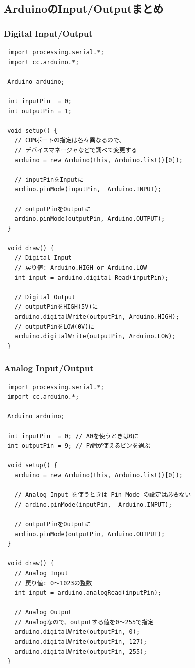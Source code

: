 \documentclass[11pt,a4paper]{jarticle}
\begin{document}
\subsection*{ArduinoのInput/Outputまとめ}

\subsubsection*{Digital Input/Output}
\begin{lstlisting}
 import processing.serial.*;
 import cc.arduino.*;

 Arduino arduino;

 int inputPin  = 0;
 int outputPin = 1;

 void setup() {
   // COMポートの指定は各々異なるので、
   // デバイスマネージャなどで調べて変更する
   arduino = new Arduino(this, Arduino.list()[0]);

   // inputPinをInputに
   ardino.pinMode(inputPin,  Arduino.INPUT);

   // outputPinをOutputに 
   ardino.pinMode(outputPin, Arduino.OUTPUT);
 }

 void draw() {
   // Digital Input
   // 戻り値: Arduino.HIGH or Arduino.LOW
   int input = arduino.digital Read(inputPin);

   // Digital Output
   // outputPinをHIGH(5V)に
   arduino.digitalWrite(outputPin, Arduino.HIGH);
   // outputPinをLOW(0V)に
   arduino.digitalWrite(outputPin, Arduino.LOW);
 } 
\end{lstlisting}


\subsubsection*{Analog Input/Output}
\begin{lstlisting}
 import processing.serial.*;
 import cc.arduino.*;

 Arduino arduino;

 int inputPin  = 0; // A0を使うときは0に
 int outputPin = 9; // PWMが使えるピンを選ぶ 

 void setup() {
   arduino = new Arduino(this, Arduino.list()[0]);

   // Analog Input を使うときは Pin Mode の設定は必要ない
   // ardino.pinMode(inputPin,  Arduino.INPUT);

   // outputPinをOutputに 
   ardino.pinMode(outputPin, Arduino.OUTPUT);
 }

 void draw() {
   // Analog Input
   // 戻り値: 0〜1023の整数
   int input = arduino.analogRead(inputPin);

   // Analog Output
   // Analogなので、outputする値を0〜255で指定
   arduino.digitalWrite(outputPin, 0);
   arduino.digitalWrite(outputPin, 127);
   arduino.digitalWrite(outputPin, 255);
 } 
\end{lstlisting}
\end{document}
